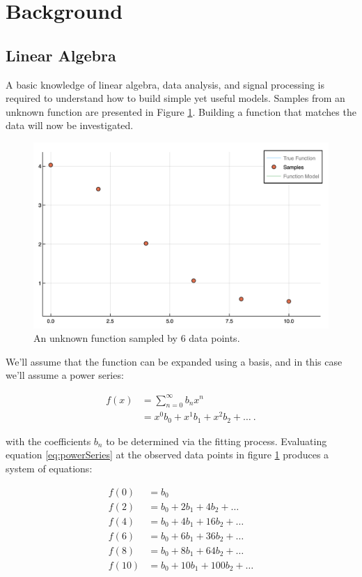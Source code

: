 \section{Background}\label{Sect:background}
\subsection{Linear Algebra}\label{Sect:linearAlgebra}
A basic knowledge of linear algebra, data analysis, and signal processing is required to understand how to build simple yet useful models. Samples from an unknown function are presented in Figure \ref{fig:func1Samples}. Building a function that matches the data will now be investigated.

\begin{figure}[h]
\includegraphics[scale = 0.4]{Figures/func1Samples}
\caption{An unknown function sampled by 6 data points.
\label{fig:func1Samples}} 
\end{figure}

\par We'll assume that the function can be expanded using a basis, and in this case we'll assume a power series:

\begin{align}
f(x) &= \sum_{n=0}^\infty b_n x^n
	\label{eq:powerSum}\\ 
&= x^0b_0 + x^1b_1 + x^2b_2 + \ldots\ .
	\label{eq:powerSeries}
\end{align}

with the coefficients $b_n$ to be determined via the fitting process.  Evaluating equation \ref{eq:powerSeries} at the observed data points in figure \ref{fig:func1Samples} produces a system of equations:

\begin{align}
f(0) &= b_0 \nonumber \\
f(2) &= b_0 + 2 b_1 + 4 b_2 + \dots \nonumber \\
f(4) &= b_0 + 4 b_1 + 16 b_2 + \dots \nonumber \\
f(6) &= b_0 + 6 b_1 + 36 b_2 + \dots \nonumber \\
f(8) &= b_0 + 8 b_1 + 64 b_2 + \dots \nonumber \\
f(10) &= b_0 + 10 b_1 + 100 b_2 + \dots\\
\end{align}

